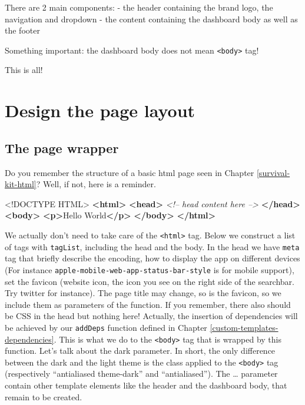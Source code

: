\documentclass[]{book}
\newenvironment{Shaded}{\begin{snugshade}}{\end{snugshade}}
\newcommand{\CommentTok}[1]{\textcolor[rgb]{0.56,0.35,0.01}{\textit{#1}}}
\newcommand{\DataTypeTok}[1]{\textcolor[rgb]{0.13,0.29,0.53}{#1}}
\newcommand{\KeywordTok}[1]{\textcolor[rgb]{0.13,0.29,0.53}{\textbf{#1}}}
\newcommand{\NormalTok}[1]{#1}
\begin{document}
There are 2 main components:
- the header containing the brand logo, the navigation and dropdown
- the content containing the dashboard body as well as the footer

Something important: the dashboard body does not mean \texttt{\textless{}body\textgreater{}} tag!

This is all!

\hypertarget{design-the-page-layout}{%
\section{Design the page layout}\label{design-the-page-layout}}

\hypertarget{the-page-wrapper}{%
\subsection{The page wrapper}\label{the-page-wrapper}}

Do you remember the structure of a basic html page seen in Chapter \ref{survival-kit-html}? Well, if not, here is a reminder.

\begin{Shaded}
\begin{Highlighting}[]
\DataTypeTok{<!DOCTYPE }\NormalTok{HTML}\DataTypeTok{>}
\KeywordTok{<html>}
  \KeywordTok{<head>}
  \CommentTok{<!-- head content here -->}
  \KeywordTok{</head>}
  \KeywordTok{<body>}
    \KeywordTok{<p>}\NormalTok{Hello World}\KeywordTok{</p>}
  \KeywordTok{</body>}
\KeywordTok{</html>}
\end{Highlighting}
\end{Shaded}

We actually don't need to take care of the \texttt{\textless{}html\textgreater{}} tag. Below we construct a list of tags with \texttt{tagList}, including the head and the body. In the head we have \texttt{meta} tag that briefly describe the encoding, how to display the app on different devices (For instance \texttt{apple-mobile-web-app-status-bar-style} is for mobile support), set the favicon (website icon, the icon you see on the right side of the searchbar. Try twitter for instance). The page title may change, so is the favicon, so we include them as parameters of the function. If you remember, there also should be CSS in the head but nothing here! Actually, the insertion of dependencies will be achieved by our \texttt{addDeps} function defined in Chapter \ref{custom-templates-dependencies}. This is what we do to the \texttt{\textless{}body\textgreater{}} tag that is wrapped by this function. Let's talk about the dark parameter. In short, the only difference between the dark and the light theme is the class applied to the \texttt{\textless{}body\textgreater{}} tag (respectively ``antialiased theme-dark'' and ``antialiased''). The \ldots{} parameter contain other template elements like the header and the dashboard body, that remain to be created.
\end{document}
